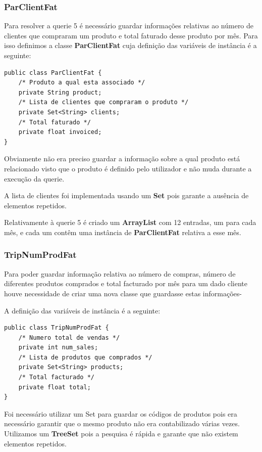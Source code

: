 \documentclass[10pt] {article}
\begin{document}
\subsubsection{ParClientFat}

Para resolver a querie 5 é necessário guardar informações relativas ao número de clientes que compraram um produto
e total faturado desse produto por mês. Para isso definimos a classe \textbf{ParClientFat} cuja definição das variáveis de
instância é a seguinte:

\begin{lstlisting}
public class ParClientFat {
	/* Produto a qual esta associado */
	private String product;
	/* Lista de clientes que compraram o produto */
	private Set<String> clients;
	/* Total faturado */
	private float invoiced;
}
\end{lstlisting}


Obviamente não era preciso guardar a informação sobre a qual produto está relacionado visto que o produto é definido
pelo utilizador e não muda durante a execução da querie.

A lista de clientes foi implementada usando um \textbf{Set} pois garante a ausência de elementos repetidos.

Relativamente à querie 5 é criado um \textbf{ArrayList} com 12 entradas, um para cada mês, e cada um contêm uma
instância de \textbf{ParClientFat} relativa a esse mês.

\subsubsection{TripNumProdFat}

Para poder guardar informação relativa ao número de compras, número de diferentes produtos comprados e total
facturado por mês para um dado cliente houve necessidade de criar uma nova classe que guardasse estas informações-

A definição das variáveis de instância é a seguinte:

\begin{lstlisting}
public class TripNumProdFat {
	/* Numero total de vendas */
	private int num_sales;
	/* Lista de produtos que comprados */
	private Set<String> products;
	/* Total facturado */
	private float total;
}
\end{lstlisting}


Foi necessário utilizar um Set para guardar os códigos de produtos pois era necessário garantir que o mesmo produto
não era contabilizado várias vezes. Utilizamos um \textbf{TreeSet} pois a pesquisa é rápida e garante que não existem
elementos repetidos.
\end{document}
